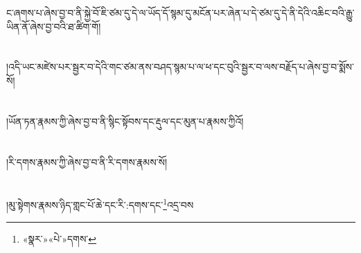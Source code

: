 ང་ཞགས་པ་ཞེས་བྱ་བ་ནི་སྐྱེ་བོ་ཇི་ཙམ་དུ་དེ་ལ་ཡོད་དོ་སྙམ་དུ་མངོན་པར་ཞེན་པ་དེ་ཙམ་དུ་དེ་ནི་དེའི་འཆིང་བའི་རྒྱུ་ཡིན་ནོ་ཞེས་བྱ་བའི་ཐ་ཚིག་གོ།\chapter{ }།འདི་ཡང་མཛེས་པར་སྦྱར་བ་དེའི་གང་ཙམ་ནས་བཤད་སྙམ་པ་ལ་ཕ་དང་བུའི་སྦྱར་བ་ལས་བརྗོད་པ་ཞེས་བྱ་བ་སྨོས་སོ།\chapter{ }།ཡོན་ཏན་རྣམས་ཀྱི་ཞེས་བྱ་བ་ནི་སྙིང་སྟོབས་དང་རྡུལ་དང་མུན་པ་རྣམས་ཀྱིའོ།\chapter{ }།རི་དགས་རྣམས་ཀྱི་ཞེས་བྱ་བ་ནི་རི་དགས་རྣམས་སོ།\chapter{ }།མུ་སྟེགས་རྣམས་ཉིད་གླང་པོ་ཆེ་དང་རི་:དགས་དང་\footnote{«སྣར་»«པེ་»དགས་}འདྲ་བས